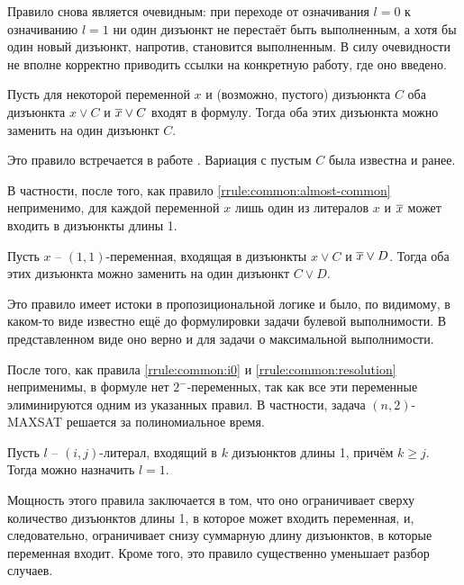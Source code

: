 Правило снова является очевидным: при переходе от означивания $l = 0$ к означиванию $l = 1$ ни один дизъюнкт не перестаёт быть выполненным, а хотя бы один новый дизъюнкт, напротив, становится выполненным. В силу очевидности не вполне корректно приводить ссылки на конкретную работу, где оно введено.

\begin{rrule}
 Пусть для некоторой переменной $x$ и (возможно, пустого) дизъюнкта $C$ оба дизъюнкта $x \vee C$ и $\overline{x} \vee C$ входят в формулу. Тогда оба этих дизъюнкта можно заменить на один дизъюнкт $C$.
 \label{rrule:common:almost-common}
\end{rrule}

Это правило встречается в работе \cite{bansal99}. Вариация с пустым $C$ была известна и ранее.

\begin{note}
 В частности, после того, как правило \ref{rrule:common:almost-common} неприменимо, для каждой переменной $x$ лишь один из литералов $x$ и $\overline{x}$ может входить в дизъюнкты длины 1.
\end{note}

\begin{rrule}
 Пусть $x$ -- $(1,1)$-переменная, входящая в дизъюнкты $x \vee C$ и $\overline{x} \vee D$. Тогда оба этих дизъюнкта можно заменить на один дизъюнкт $C \vee D$.
 \label{rrule:common:resolution}
\end{rrule}

Это правило имеет истоки в пропозициональной логике и было, по видимому, в каком-то виде известно ещё до формулировки задачи булевой выполнимости. В представленном виде оно верно и для задачи о максимальной выполнимости.

\begin{note}
 После того, как правила \ref{rrule:common:i0} и \ref{rrule:common:resolution} неприменимы, в формуле нет $2^-$-переменных, так как все эти переменные элиминируются одним из указанных правил. В частности, задача $(n,2)$-MAXSAT решается за полиномиальное время.
\end{note}

\begin{rrule}
 Пусть $l$ -- $(i,j)$-литерал, входящий в $k$ дизъюнктов длины 1, причём $k \geq j$. Тогда можно назначить $l = 1$.
 \label{rrule:common:unit-clauses}
\end{rrule}

Мощность этого правила заключается в том, что оно ограничивает сверху количество дизъюнктов длины 1, в которое может входить переменная, и, следовательно, ограничивает снизу суммарную длину дизъюнктов, в которые переменная входит. Кроме того, это правило существенно уменьшает разбор случаев.

